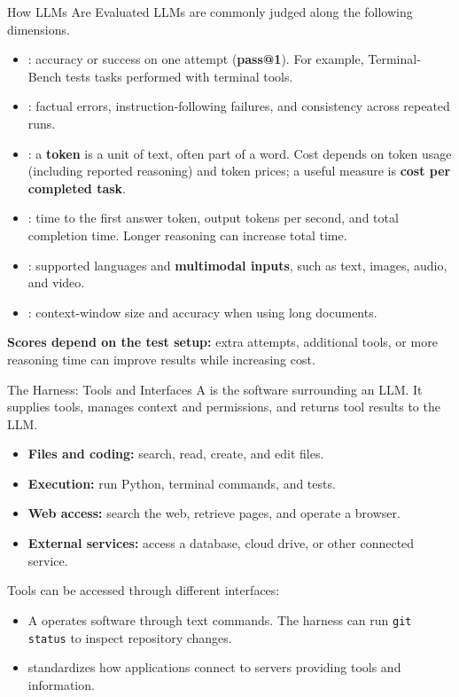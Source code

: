 \begin{frame}{How LLMs Are Evaluated}
\small
LLMs are commonly judged along the following dimensions.
\begin{itemize}
\setlength{\itemsep}{0mm}
\item {}: accuracy or success on one attempt (\textbf{pass@1}). For example, Terminal-Bench tests tasks performed with terminal tools.
\item {}: factual errors, instruction-following failures, and consistency across repeated runs.
\item {}: a \textbf{token} is a unit of text, often part of a word. Cost depends on token usage (including reported reasoning) and token prices; a useful measure is \textbf{cost per completed task}.
\item {}: time to the first answer token, output tokens per second, and total completion time. Longer reasoning can increase total time.
\item {}: supported languages and \textbf{multimodal inputs}, such as text, images, audio, and video.
\item {}: context-window size and accuracy when using long documents.
\end{itemize}
\par\smallskip
\textbf{Scores depend on the test setup:} extra attempts, additional tools, or more reasoning time can improve results while increasing cost.
\end{frame}

\begin{frame}{The Harness: Tools and Interfaces}
\small
A  is the software surrounding an LLM. It supplies tools, manages context and permissions, and returns tool results to the LLM.
\begin{itemize}
\setlength{\itemsep}{1mm}
\item \textbf{Files and coding:} search, read, create, and edit files.
\item \textbf{Execution:} run Python, terminal commands, and tests.
\item \textbf{Web access:} search the web, retrieve pages, and operate a browser.
\item \textbf{External services:} access a database, cloud drive, or other connected service.
\end{itemize}
\par\smallskip
Tools can be accessed through different interfaces:
\begin{itemize}
\setlength{\itemsep}{1mm}
\item A  operates software through text commands. The harness can run \texttt{git status} to inspect repository changes.
\item {} standardizes how applications connect to servers providing tools and information.
\end{itemize}
\end{frame}

